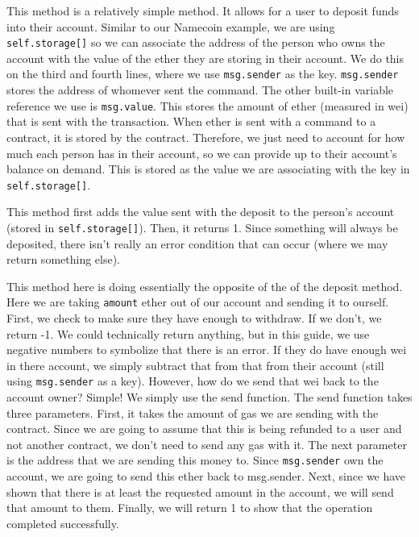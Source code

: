 \documentclass[12pt]{article}
\begin{document}
This method is a relatively simple method. It allows for a user to deposit funds into their account. Similar to our Namecoin example, we are using \texttt{self.storage[]} so we can associate the address of the person who owns the account with the value of the ether they are storing in their account. We do this on the third and fourth lines, where we use \texttt{msg.sender} as the key. \texttt{msg.sender} stores the address of whomever sent the command. The other built-in variable reference we use is \texttt{msg.value}. This stores the amount of ether (measured in wei) that is sent with the transaction. When ether is sent with a command to a contract, it is stored by the contract. Therefore, we just need to account for how much each person has in their account, so we can provide up to their account's balance on demand. This is stored as the value we are associating with the key in \texttt{self.storage[]}.
 
This method first adds the value sent with the deposit to the person's account (stored in \texttt{self.storage[]}). Then, it returns 1. Since something will always be deposited, there isn't really an error condition that can occur (where we may return something else). 


This method here is doing essentially the opposite of the of the deposit method. Here we are taking \texttt{amount} ether out of our account and sending it to ourself. First, we check to make sure they have enough to withdraw. If we don't, we return -1. We could technically return anything, but in this guide, we use negative numbers to symbolize that there is an error. If they do have enough wei in there account, we simply subtract that from that from their account (still using \texttt{msg.sender} as a key). However, how do we send that wei back to the account owner? Simple! We simply use the send function. The send function takes three parameters. First, it takes the amount of gas we are sending with the contract. Since we are going to assume that this is being refunded to a user and not another contract, we don't need to send any gas with it. The next parameter is the address that we are sending this money to. Since \texttt{msg.sender} own the account, we are going to send this ether back to msg.sender. Next, since we have shown that there is at least the requested amount in the account, we will send that amount to them. Finally, we will return 1 to show that the operation completed successfully.
\end{document}
